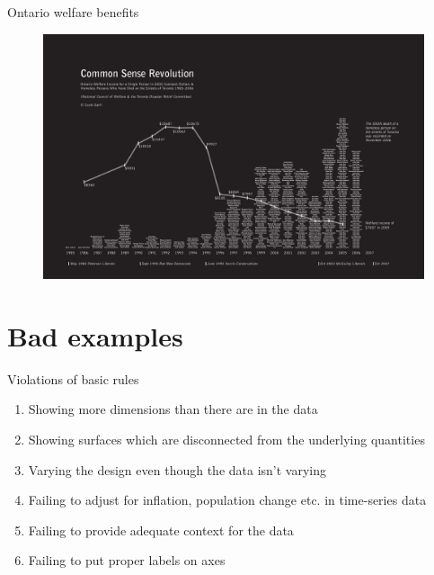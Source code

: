 \documentclass[12pt,english,pdf,dvipsnames,handout]{beamer}
\begin{document}
\begin{frame}{Ontario welfare benefits}

\begin{figure}
  \centering
  \includegraphics[scale=0.30]{../04-graphs/09_Ontario_welfare}
\end{figure}

\end{frame}




\section{Bad examples}

\begin{frame}{Violations of basic rules \cite{Tufte2001}}

\begin{enumerate}
	\item Showing more dimensions than there are in the data
	\pause
	\item Showing surfaces which are disconnected from the underlying quantities
	\pause
	\item Varying the design even though the data isn't varying
	\pause
	\item Failing to adjust for inflation, population change etc. in time-series data
	\pause
	\item Failing to provide adequate context for the data
	\pause
	\item Failing to put proper labels on axes
\end{enumerate}


\end{frame}
\end{document}
